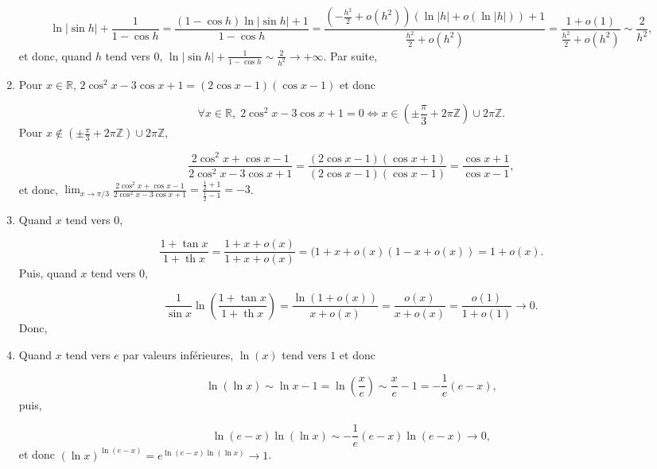 \documentclass[11pt,a4paper]{article}
\newcommand{\Zz}{\mathbb{Z}} \newcommand{\Z}{\mathbb{Z}}
\newcommand{\Rr}{\mathbb{R}} \newcommand{\R}{\mathbb{R}}
\renewcommand{\tanh}{\mathop{\mathrm{th}}\nolimits}
\begin{document}
\begin{enumerate}
$$\ln|\sin h|+\frac{1}{1-\cos h}=\frac{(1-\cos h)\ln|\sin h|+1}{1-\cos h}=\frac{(-\frac{h^2}{2}+o(h^2))(\ln|h|+o(\ln|h|))+1}{\frac{h^2}{2}+o(h^2)}=\frac{1+o(1)}{\frac{h^2}{2}+o(h^2)}
\sim\frac{2}{h^2},$$ et donc, quand $h$ tend vers $0$, $\ln|\sin h|+\frac{1}{1-\cos h}\sim\frac{2}{h^2}\rightarrow+\infty$. Par suite,

\begin{center}
\end{center}

 \item  Pour $x\in\Rr$, $2\cos^2x-3\cos x+1=(2\cos x-1)(\cos x-1)$ et donc 

$$\forall x\in\Rr,\;2\cos^2x-3\cos x+1=0\Leftrightarrow x\in\left(\pm\frac{\pi}{3}+2\pi\Zz\right)\cup2\pi\Zz.$$
Pour $x\notin\left(\pm\frac{\pi}{3}+2\pi\Zz\right)\cup2\pi\Zz$,
  
$$\frac{2\cos^2x+\cos x-1}{2\cos^2x-3\cos x+1}=\frac{(2\cos x-1)(\cos x+1)}{(2\cos x-1)(\cos x-1)}
=\frac{\cos x+1}{\cos x-1},$$
et donc, $\lim_{x\rightarrow \pi/3}\frac{2\cos^2x+\cos x-1}{2\cos^2x-3\cos x+1}=\frac{\frac{1}{2}+1}{\frac{1}{2}-1}=-3$.

\begin{center}
\end{center}
 \item  Quand $x$ tend vers $0$, 
 
$$\frac{1+\tan x}{1+\tanh x}=\frac{1+x+o(x)}{1+x+o(x)}=(1+x+o(x)(1-x+o(x))=1+o(x).$$
Puis, quand $x$ tend vers $0$,

$$\frac{1}{\sin x}\ln\left(\frac{1+\tan x}{1+\tanh x}\right)=\frac{\ln(1+o(x))}{x+o(x)}=\frac{o(x)}{x+o(x)}=\frac{o(1)}{1+o(1)}\rightarrow0.$$
Donc, 

\begin{center}
\shadowbox{
$\lim_{x\rightarrow 0}\left(\frac{1+\tan x}{1+\tanh x}\right)^{1/\sin x}=1$.
}
\end{center}

 \item  Quand $x$ tend vers $e$ par valeurs inférieures, $\ln(x)$ tend vers $1$ et donc

$$\ln(\ln x)\sim\ln x-1=\ln\left(\frac{x}{e}\right)\sim\frac{x}{e}-1=-\frac{1}{e}(e-x),$$
puis,

$$\ln(e-x)\ln(\ln x)\sim-\frac{1}{e}(e-x)\ln(e-x)\rightarrow 0,$$
et donc $(\ln x)^{\ln(e-x)}=e^{\ln(e-x)\ln(\ln x)}\rightarrow 1$.


\end{enumerate}
\end{document}
